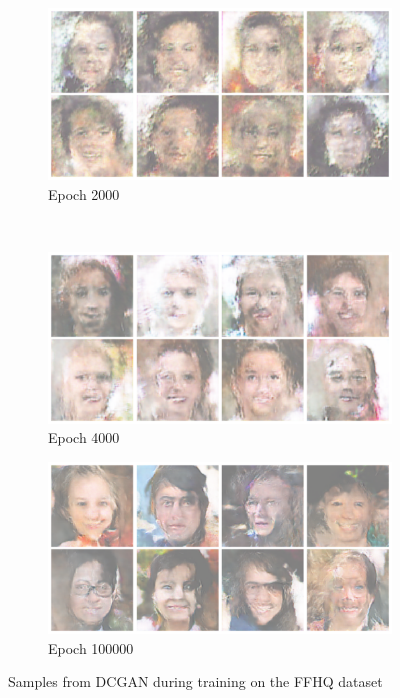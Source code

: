 \begin{figure}
    \begin{subfigure}[b]{0.45\textwidth}
        \includegraphics[width=\textwidth]{fig/dcgan/ffhq/epoch2000}
        \caption{Epoch 2000}
    \end{subfigure}
    ~
    \begin{subfigure}[b]{0.45\textwidth}
        \includegraphics[width=\textwidth]{fig/dcgan/ffhq/epoch4000}
        \caption{Epoch 4000}
    \end{subfigure}

    \begin{subfigure}[b]{\textwidth}
        \includegraphics[width=\textwidth]{fig/dcgan/ffhq/epoch10000}
        \caption{Epoch 100000}
    \end{subfigure}
    \caption{Samples from DCGAN during training on the FFHQ dataset}
    \label{dcgan-ffhq-samples}
\end{figure}


